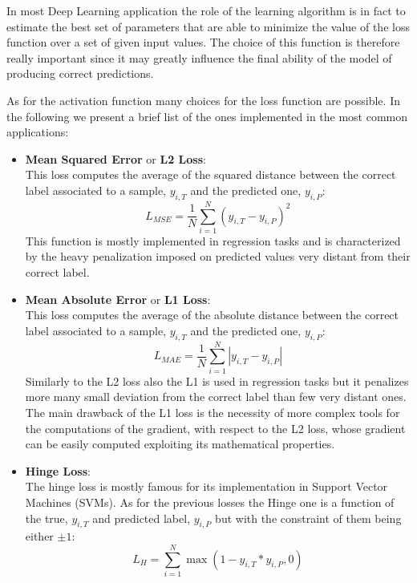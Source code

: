 \documentclass[../../main.tex]{subfiles}
\begin{document}
In most Deep Learning application the role of the learning algorithm is in fact to estimate the best set of parameters that are able to minimize the value of the loss function over a set of given input values. The choice of this function is therefore really important since it may greatly influence the final ability of the model of producing correct predictions.

As for the activation function many choices for the loss function are possible. In the following we present a brief list of the ones implemented in the most common applications:
\begin{itemize}
    \item \textbf{Mean Squared Error} or \textbf{L2 Loss}:\\
    This loss computes the average of the squared distance between the correct label associated to a sample, $y_{i,T}$ and the predicted one, $y_{i,P}$:
    \begin{equation}
        L_{MSE}= \frac{1}{N}\sum_{i=1}^N \left(y_{i,T}-y_{i,P}\right)^2
    \end{equation}
    This function is mostly implemented in regression tasks and is characterized by the heavy penalization imposed on predicted values very distant from their correct label. 
    \item \textbf{Mean Absolute Error} or \textbf{L1 Loss}:\\
    This loss computes the average of the absolute distance between the correct label associated to a sample, $y_{i,T}$ and the predicted one, $y_{i,P}$:
    \begin{equation}
        L_{MAE}= \frac{1}{N}\sum_{i=1}^N \left|y_{i,T}-y_{i,P}\right|
    \end{equation}
    Similarly to the L2 loss also the L1 is used in regression tasks but it penalizes more many small deviation from the correct label than few very distant ones. The main drawback of the L1 loss is the necessity of more complex tools for the computations of the gradient, with respect to the L2 loss, whose gradient can be easily computed exploiting its mathematical properties. 
\item \textbf{Hinge Loss}:\\
    The hinge loss is mostly famous for its implementation in Support Vector Machines (SVMs). As for the previous losses the Hinge one is a function of the true, $y_{i,T}$ and  predicted label, $y_{i,P}$ but with the constraint of them being either $\pm 1$:
    \begin{equation}
        L_{H}= \sum_{i=1}^N \max\left( 1-y_{i,T}*y_{i,P},0\right)

\end{equation}
\end{itemize}
\end{document}

